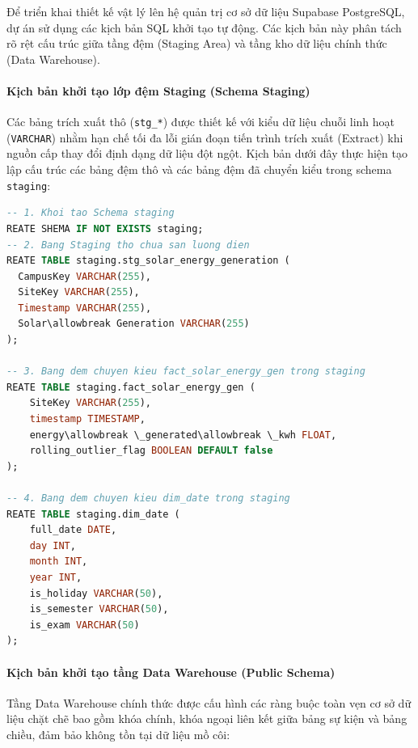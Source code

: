 \documentclass[12pt,a4paper]{article}
\begin{document}
Để triển khai thiết kế vật lý lên hệ quản trị cơ sở dữ liệu Supabase PostgreSQL, dự án sử dụng các kịch bản SQL khởi tạo tự động. Các kịch bản này phân tách rõ rệt cấu trúc giữa tầng đệm (Staging Area) và tầng kho dữ liệu chính thức (Data Warehouse).

\paragraph{Kịch bản khởi tạo lớp đệm Staging (Schema Staging)}
Các bảng trích xuất thô (\texttt{stg\_*}) được thiết kế với kiểu dữ liệu chuỗi linh hoạt (\texttt{VARCHAR}) nhằm hạn chế tối đa lỗi gián đoạn tiến trình trích xuất (Extract) khi nguồn cấp thay đổi định dạng dữ liệu đột ngột. Kịch bản dưới đây thực hiện tạo lập cấu trúc các bảng đệm thô và các bảng đệm đã chuyển kiểu trong schema \texttt{staging}:

\begin{lstlisting}[language=SQL, caption={Kịch bản SQL khởi tạo schema staging và các bảng đệm dữ liệu}, label={lst:create_staging}]
-- 1. Khoi tao Schema staging
REATE SHEMA IF NOT EXISTS staging;
-- 2. Bang Staging tho chua san luong dien
REATE TABLE staging.stg_solar_energy_generation (
  CampusKey VARCHAR(255),
  SiteKey VARCHAR(255),
  Timestamp VARCHAR(255),
  Solar\allowbreak Generation VARCHAR(255)
);

-- 3. Bang dem chuyen kieu fact_solar_energy_gen trong staging
REATE TABLE staging.fact_solar_energy_gen (
    SiteKey VARCHAR(255),
    timestamp TIMESTAMP,
    energy\allowbreak \_generated\allowbreak \_kwh FLOAT,
    rolling_outlier_flag BOOLEAN DEFAULT false
);

-- 4. Bang dem chuyen kieu dim_date trong staging
REATE TABLE staging.dim_date (
    full_date DATE,
    day INT,
    month INT,
    year INT,
    is_holiday VARCHAR(50),
    is_semester VARCHAR(50),
    is_exam VARCHAR(50)
);
\end{lstlisting}

\newpage

\paragraph{Kịch bản khởi tạo tầng Data Warehouse (Public Schema)}
Tầng Data Warehouse chính thức được cấu hình các ràng buộc toàn vẹn cơ sở dữ liệu chặt chẽ bao gồm khóa chính, khóa ngoại liên kết giữa bảng sự kiện và bảng chiều, đảm bảo không tồn tại dữ liệu mồ côi:
\end{document}
